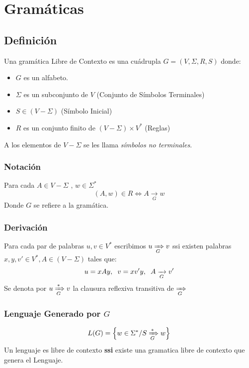 \section{Gramáticas}
\subsection{Definición}
Una gramática Libre de Contexto es una cuádrupla $G=(V,\Sigma,R,S)$ donde:
\begin{itemize}
\item $G$ es un alfabeto.
\item  $\Sigma$ es un subconjunto de $V$ (Conjunto de Símbolos Terminales)
\item $S\in (V-\Sigma)$ (Símbolo Inicial)
\item $R$ es un conjunto finito de $(V-\Sigma)\times V^*$ (Reglas)
\end{itemize}

\begin{center}
\end{center}
A los elementos de $V-\Sigma$ se les llama \textit{símbolos no terminales}.
\subsubsection{Notación}
Para cada $A\in V-\Sigma \text{ , } w\in\Sigma^*$
$$
(A,w)\in R \Leftrightarrow A \xrightarrow[G]{} w
$$
Donde $G$ se refiere a la gramática.
\subsubsection{Derivación}
Para cada par de palabras $u,v \in V^*$ escribimos $u \xRightarrow[G]{} v$ ssi existen palabras $x,y,v' \in V^*,A\in(V-\Sigma)$ tales que:
$$
u = xAy ,\hspace{0.2cm} v = xv' y ,\hspace{0.2cm} A \xrightarrow[G]{} v'
$$
Se denota por $u \xRightarrow[G]{*} v$ la clausura reflexiva transitiva de $\xRightarrow[G]{}$
\subsubsection{Lenguaje Generado por $G$}
$$
L(G) = \Big\{ w\in \Sigma^* / S \xRightarrow[G]{*} w \Big\} 
$$
Un lenguaje es libre de contexto \textbf{ssi} existe una gramatica libre de contexto que genera el Lenguaje.
